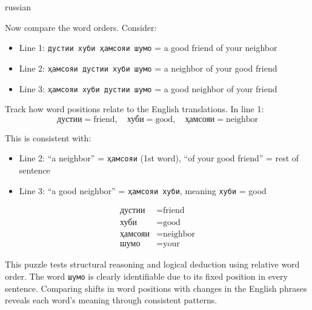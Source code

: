 \documentclass{article}
\begin{document}
\begin{otherlanguage*}{russian}
\begin{soln}
    Now compare the word orders. Consider:
    \begin{itemize}[topsep=0pt, partopsep=0pt, itemsep=2pt]
        \item Line 1: \texttt{дустии хуби ҳамсояи шумо} = a good friend of your neighbor
        \item Line 2: \texttt{ҳамсояи дустии хуби шумо} = a neighbor of your good friend
        \item Line 3: \texttt{ҳамсояи хуби дустии шумо} = a good neighbor of your friend
    \end{itemize}

    Track how word positions relate to the English translations. In line 1:
    \[
        \texttt{дустии} = \text{friend}, \quad \texttt{хуби} = \text{good}, \quad \texttt{ҳамсояи} = \text{neighbor}
    \]
    
    This is consistent with:
    \begin{itemize}[topsep=0pt, partopsep=0pt, itemsep=2pt]
        \item Line 2: ``a neighbor'' = \texttt{ҳамсояи} (1st word), ``of your good friend'' = rest of sentence
        \item Line 3: ``a good neighbor'' = \texttt{ҳамсояи хуби}, meaning \texttt{хуби} = good
    \end{itemize}

    \[
        \begin{aligned}
            \text{дустии} & = \text{friend} \\
            \text{хуби} & = \text{good} \\
            \text{ҳамсояи} & = \text{neighbor} \\
            \text{шумо} & = \text{your}
        \end{aligned}
    \]
\end{soln}

\begin{remark*}
    This puzzle tests structural reasoning and logical deduction using relative word order. The word \texttt{шумо} is clearly identifiable due to its fixed position in every sentence. Comparing shifts in word positions with changes in the English phrases reveals each word's meaning through consistent patterns.
\end{remark*}

\end{otherlanguage*}
\end{document}
